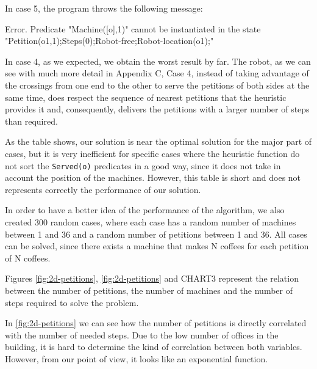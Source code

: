 \documentclass[12pt,a4paper,oneside]{article}
\numberwithin{equation}{section}
\numberwithin{equation}{section}
\theoremstyle{definition}
\begin{document}
\begin{itemize}
\newcommand{\plottwodee}[1]{
	\begin{tikzpicture}
		\begin{axis}[
				xlabel={#1},
				ylabel=Steps,
			]
			\addplot[
				scatter,
				only marks,
			]
			table[
				x=#1,
				y=Steps,
				col sep=comma,
			]{results.csv};
		\end{axis}		
	\end{tikzpicture}
}

In case 5, the program throws the following message:
\begin{listing}[style=consola, numbers=none]
Error. Predicate "Machine([o],1)" cannot be instantiated in the state "Petition(o1,1);Steps(0);Robot-free;Robot-location(o1);"
\end{listing}

In case 4, as we expected, we obtain the worst result by far. The robot, as we can see with much more detail in Appendix C, Case 4, instead of taking advantage of the crossings from one end to the other to serve the petitions of both sides at the same time, does respect the sequence of nearest petitions that the heuristic provides it and, consequently, delivers the petitions with a larger number of steps than required.


As the table shows, our solution is near the optimal solution for the major part of cases, but it is very inefficient for specific cases where the heuristic function do not sort the \texttt{Served(o)} predicates in a good way, since it does not take in account the position of the machines. However, this table is short and does not represents correctly the performance of our solution.


In order to have a better idea of the performance of the algorithm, we also created 300 random cases, where each case has a random number of machines between 1 and 36 and a random number of petitions between 1 and 36. All cases can be solved, since there exists a machine that makes N coffees for each petition of N coffees.

Figures \ref{fig:2d-petitions}, \ref{fig:2d-petitions} and CHART3 represent the relation between the number of petitions, the number of machines and the number of steps required to solve the problem.

In \ref{fig:2d-petitions} we can see how the number of petitions is directly correlated with the number of needed steps. Due to the low number of offices in the building, it is hard to determine the kind of correlation between both variables. However, from our point of view, it looks like an exponential function.
	

\end{itemize}
\end{document}
